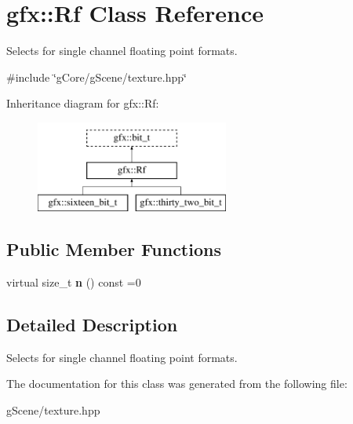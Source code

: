 \hypertarget{classgfx_1_1Rf}{\section{gfx\-:\-:Rf Class Reference}
\label{classgfx_1_1Rf}
}


Selects for single channel floating point formats.  




{\ttfamily \#include \char`\"{}g\-Core/g\-Scene/texture.\-hpp\char`\"{}}

Inheritance diagram for gfx\-:\-:Rf\-:\begin{figure}[H]
\begin{center}
\leavevmode
\includegraphics[height=3.000000cm]{classgfx_1_1Rf}
\end{center}
\end{figure}
\subsection*{Public Member Functions}
\begin{DoxyCompactItemize}
\item 
\hypertarget{classgfx_1_1Rf_a5fe890ef699ab5047e1c4f4e4d1ed859}{virtual size\-\_\-t {\bfseries n} () const =0}\label{classgfx_1_1Rf_a5fe890ef699ab5047e1c4f4e4d1ed859}

\end{DoxyCompactItemize}


\subsection{Detailed Description}
Selects for single channel floating point formats. 

The documentation for this class was generated from the following file\-:\begin{DoxyCompactItemize}
\item 
g\-Scene/texture.\-hpp\end{DoxyCompactItemize}

